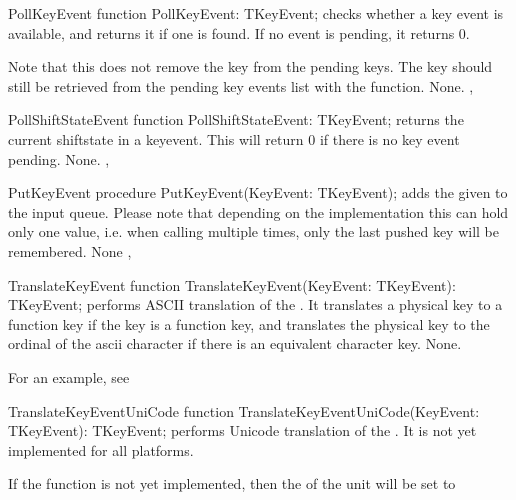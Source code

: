 \begin{function}{PollKeyEvent}
\Declaration
function PollKeyEvent: TKeyEvent;
\Description
{} checks whether a key event is available, 
and returns it if one is found. If no event is pending, 
it returns 0. 

Note that this does not remove the key from the pending keys. 
The key should still be retrieved from the pending key events 
list with the  function.
\Errors
None.
\SeeAlso
{}, 
\end{function}


\begin{function}{PollShiftStateEvent}
\Declaration
function PollShiftStateEvent: TKeyEvent;
\Description
{} returns the current shiftstate in a 
keyevent. This will return 0 if there is no key event pending.
\Errors
None.
\SeeAlso
{}, 
\end{function}


\begin{procedure}{PutKeyEvent}
\Declaration
procedure PutKeyEvent(KeyEvent: TKeyEvent);
\Description
{} adds the given  to the input 
queue. Please note that depending on the implementation this 
can hold only one value, i.e. when calling 
multiple times, only the last pushed key will be remembered.
\Errors
None
\SeeAlso
{}, 
\end{procedure}


\begin{function}{TranslateKeyEvent}
\Declaration
function TranslateKeyEvent(KeyEvent: TKeyEvent): TKeyEvent;
\Description
{} performs ASCII translation of the .
It translates a physical key to a function key if the key is a function key,
and translates the physical key to the ordinal of the ascii character if 
there is an equivalent character key.
\Errors
None.
\SeeAlso
{}
\end{function}

For an example, see 

\begin{function}{TranslateKeyEventUniCode}
\Declaration
function TranslateKeyEventUniCode(KeyEvent: TKeyEvent): TKeyEvent;
\Description
{} performs Unicode translation of the 
. It is not yet implemented for all platforms.

\Errors
If the function is not yet implemented, then the  of the 
 unit will be set to 
\SeeAlso
\end{function}

